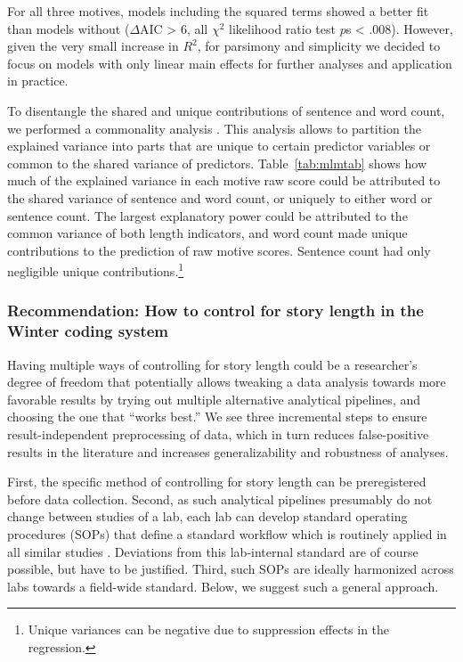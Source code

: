 \documentclass[man,a4paper,mask]{apa6}\usepackage[]{graphicx}\usepackage[]{color}
\begin{document}
For all three motives, models including the squared terms showed a better fit than models without ($\Delta$AIC > 6, all $\chi^2$ likelihood ratio test $p$s < .008). However, given the very small increase in $R^2$, for parsimony and simplicity we decided to focus on models with only linear main effects for further analyses and application in practice.


To disentangle the shared and unique contributions of sentence and word count, we performed a commonality analysis \parencite{nimon_r_2008}. This analysis allows to partition the explained variance into parts that are unique to certain predictor variables or common to the shared variance of predictors. Table~\ref{tab:mlmtab} shows how much of the explained variance in each motive raw score could be attributed to the shared variance of sentence and word count, or uniquely to either word or sentence count. The largest explanatory power could be attributed to the common variance of both length indicators, and word count made unique contributions to the prediction of raw motive scores. Sentence count had only negligible unique contributions.\footnote{Unique variances can be negative due to suppression effects in the regression.}


\subsubsection{Recommendation: How to control for story length in the Winter coding system}
Having multiple ways of controlling for story length could be a researcher's degree of freedom \parencite{john_measuring_2012} that potentially allows tweaking a data analysis towards more favorable results by trying out multiple alternative analytical pipelines, and choosing the one that ``works best.'' We see three incremental steps to ensure result-independent preprocessing of data, which in turn reduces false-positive results in the literature and increases generalizability and robustness of analyses. 

First, the specific method of controlling for story length can be preregistered before data collection. Second, as such analytical pipelines presumably do not change between studies of a lab, each lab can develop standard operating procedures (SOPs) that define a standard workflow which is routinely applied in all similar studies \parencite{lin_StandardOperatingProcedures_2016}. Deviations from this lab-internal standard are of course possible, but have to be justified. Third, such SOPs are ideally harmonized across labs towards a field-wide standard. Below, we suggest such a general approach.
\end{document}
